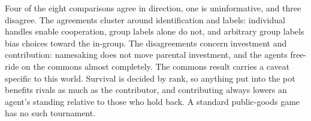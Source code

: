 Four of the eight comparisons agree in direction, one is uninformative, and three disagree. The
agreements cluster around identification and labels: individual handles enable cooperation, group
labels alone do not, and arbitrary group labels bias choices toward the in-group. The
disagreements concern investment and contribution: namesaking does not move parental investment,
and the agents free-ride on the commons almost completely. The commons result carries a caveat
specific to this world. Survival is decided by rank, so anything put into the pot benefits rivals
as much as the contributor, and contributing always lowers an agent's standing relative to those
who hold back. A standard public-goods game has no such tournament.

